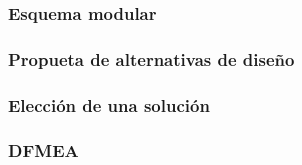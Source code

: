 \documentclass[../../../main.tex]{subfiles}
\begin{document}
\subsubsection{Esquema modular}\label{subsubsec:esquema}


\subsubsection{Propueta de alternativas de diseño}\label{subsubsec:alternativas}


\subsubsection{Elección de una solución}\label{subsubsec:eleccion}


\subsubsection{DFMEA}\label{subsubsec:DFMEA}

\end{document}
